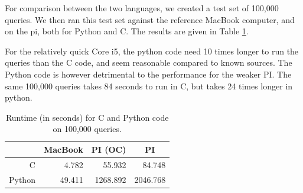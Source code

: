 For comparison between the two languages, we created a test set of 100,000 queries. We then ran this test set against the reference MacBook computer, and on the pi, both for Python and {C}.
The results are given in Table \ref{tbl:runtimes_ports}.

For the relatively quick {Core i5}, the python code need 10 times longer to run the queries than the C code, and seem reasonable compared to known sources.
The Python code is however detrimental to the performance for the weaker PI. The same 100,000 queries takes 84 seconds to run in C, but takes 24 times longer in python.

\begin{table}[h]
	\begin{center}
	\begin{tabular}{|r|r|r|r|}
	\hline
	   & \multicolumn{1}{|c|}{MacBook} & \multicolumn{1}{|c|}{PI (OC)}  & \multicolumn{1}{|c|}{PI} \\
	\hline
	C      & 4.782 & 55.932 & 84.748     \\
	\hline
	Python & 49.411 & 1268.892 & 2046.768   \\
	\hline
	\end{tabular}
	\caption{Runtime (in seconds) for C and Python code on 100,000 queries.}
	\label{tbl:runtimes_ports}
	\end{center}
\end{table}

